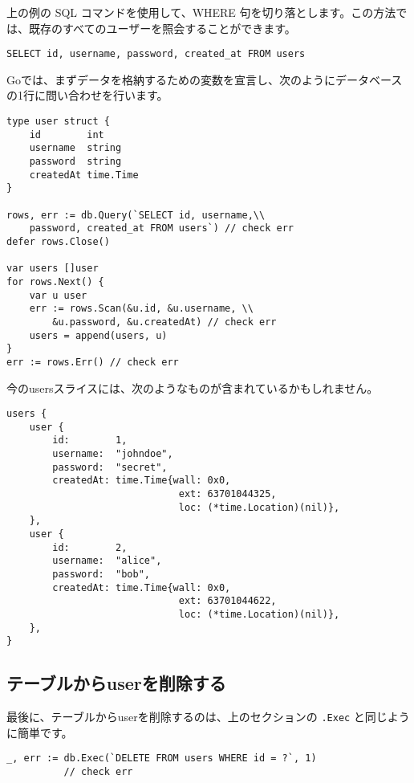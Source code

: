上の例の SQL コマンドを使用して、WHERE 句を切り落とします。この方法では、既存のすべてのユーザーを照会することができます。

\begin{lstlisting}[numbers=none]
SELECT id, username, password, created_at FROM users
\end{lstlisting}

Goでは、まずデータを格納するための変数を宣言し、次のようにデータベースの1行に問い合わせを行います。

\begin{lstlisting}[numbers=none]
type user struct {
    id        int
    username  string
    password  string
    createdAt time.Time
}

rows, err := db.Query(`SELECT id, username,\\
    password, created_at FROM users`) // check err
defer rows.Close()

var users []user
for rows.Next() {
    var u user
    err := rows.Scan(&u.id, &u.username, \\
        &u.password, &u.createdAt) // check err
    users = append(users, u)
}
err := rows.Err() // check err
\end{lstlisting}

今のusersスライスには、次のようなものが含まれているかもしれません。

\begin{lstlisting}[numbers=none]
users {
    user {
        id:        1,
        username:  "johndoe",
        password:  "secret",
        createdAt: time.Time{wall: 0x0,
                              ext: 63701044325,
                              loc: (*time.Location)(nil)},
    },
    user {
        id:        2,
        username:  "alice",
        password:  "bob",
        createdAt: time.Time{wall: 0x0,
                              ext: 63701044622,
                              loc: (*time.Location)(nil)},
    },
}
\end{lstlisting}

\subsection{テーブルからuserを削除する}

最後に、テーブルからuserを削除するのは、上のセクションの \texttt{.Exec} と同じように簡単です。


\begin{lstlisting}[numbers=none]
_, err := db.Exec(`DELETE FROM users WHERE id = ?`, 1)
          // check err
\end{lstlisting}


